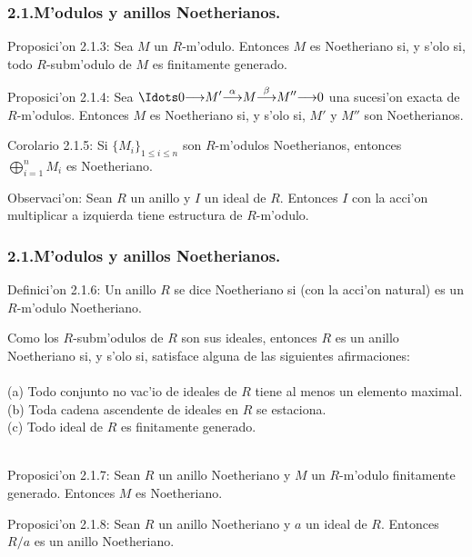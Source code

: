 \documentclass[10pt]{beamer}
\begin{document}
\begin{frame}
\frametitle{2.1.M'odulos y anillos Noetherianos.}
\begin{block}{Proposici'on 2.1.3:}
Sea $M$ un $R$-m'odulo. Entonces $M$ es Noetheriano si, y s'olo si, todo $R$-subm'odulo de $M$ es finitamente generado.\\
\end{block}
\begin{block}{Proposici'on 2.1.4:}
Sea ${\displaystyle \Idots 0 {\longrightarrow} M' {\overset{\alpha}{\longrightarrow}} M {\overset{\beta}{\longrightarrow}} M'' {\longrightarrow} 0}$ una sucesi'on exacta de $R$-m'odulos. Entonces $M$ es Noetheriano si, y s'olo si, $M'$ y $M''$ son Noetherianos.\\
\end{block}
\begin{block}{Corolario 2.1.5:}
Si $\{ M_i\}_{1\leq i \leq n}$ son $R$-m'odulos Noetherianos, entonces\\
$\bigoplus ^{n}_{i=1}{M_i}$ es Noetheriano.\\
\end{block}
\begin{block}{Observaci'on:}
Sean $R$ un anillo y $I$ un ideal de $R$. Entonces $I$ con la acci'on multiplicar a izquierda tiene estructura de $R$-m'odulo.\\ 
\end{block}

\end{frame}


\begin{frame}
\frametitle{2.1.M'odulos y anillos Noetherianos.}
\begin{block}{Definici'on 2.1.6:}
Un anillo $R$ se dice Noetheriano si (con la acci'on natural) es un $R$-m'odulo Noetheriano.\\
\end{block}
Como los $R$-subm'odulos de $R$ son sus ideales, entonces $R$ es un anillo Noetheriano si, y s'olo si, satisface alguna de las siguientes afirmaciones:\\
\\
(a) Todo conjunto no vac'io de ideales de $R$ tiene al menos un elemento maximal.\\
(b) Toda cadena ascendente de ideales en $R$ se estaciona.\\
(c) Todo ideal de $R$ es finitamente generado.\\
\\
\begin{block}{Proposici'on 2.1.7:}
Sean $R$ un anillo Noetheriano y $M$ un $R$-m'odulo finitamente generado. Entonces $M$ es Noetheriano.\\
\end{block}
\begin{block}{Proposici'on 2.1.8:}
Sean $R$ un anillo Noetheriano y $a$ un ideal de $R$. Entonces $R/a$ es un anillo Noetheriano.\\
\end{block}
\end{frame}
\end{document}
